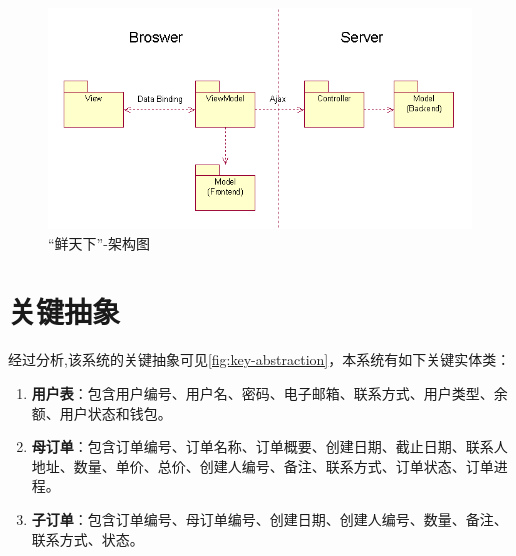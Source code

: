 \begin{figure}[htp]
    \centering
    \includegraphics[width=15cm]{figure/mvvm_new.png}
    \caption{“鲜天下”-架构图}
    \label{fig:mvvm}
\end{figure}


\section{关键抽象}

经过分析,该系统的关键抽象可见\autoref{fig:key-abstraction}，本系统有如下关键实体类：


\begin{enumerate}
    \item \textbf{用户表}：包含用户编号、用户名、密码、电子邮箱、联系方式、用户类型、余额、用户状态和钱包。
    \item \textbf{母订单}：包含订单编号、订单名称、订单概要、创建日期、截止日期、联系人地址、数量、单价、总价、创建人编号、备注、联系方式、订单状态、订单进程。
    \item \textbf{子订单}：包含订单编号、母订单编号、创建日期、创建人编号、数量、备注、联系方式、状态。
\end{enumerate}


